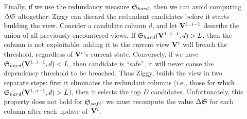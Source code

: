 Finally, if we use the redundancy measure $\mathfrak{S}_{hard}$, then we can avoid
computing $ \Delta\mathfrak{S}$ altogether: Ziggy can discard the redundant
candidates before it starts building the view.  Consider a candidate column
$d$, and let $\mathbf{V}^{1..i-1}$ describe the union of all previously encountered
views. If $\mathfrak{S}_{hard} (\mathbf{V}^{1..i-1}, d) > L$, then the column is not
exploitable: adding it to the current view $\mathbf{V}^{i}$ will breach the
threshold, regardless of $\mathbf{V}^{i}$'s current state.  Conversely, if we have
$\mathfrak{S}_{hard}(\mathbf{V}^{1..i-1}, d) < L$, then candidate is ``safe'', it will
never cause the dependency threshold to be breached.  Thus Ziggy, builds the
view in two separate steps: first it eliminates the redundant columns (i.e.,
those for which $\mathfrak{S}_{hard} (\mathbf{V}^{1..i-1}, d) > L$), then it selects the
top $D$ candidates.  Unfortunately, this property does not hold for
$\mathfrak{S}_{soft}$: we must recompute the value $\Delta\mathfrak{S}$ for each column
after each update of~$\mathbf{V}^{i}$.


